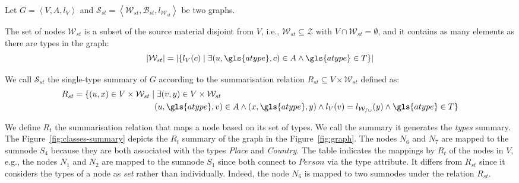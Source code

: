 \begin{definition}
Let $G=\left\langle V, A, l_V \right\rangle$ and $\mathcal{S}_{st} = \left\langle \mathcal{W}_{st}, \mathcal{B}_{st}, l_{\mathcal{W}_{st}} \right\rangle$ be two graphs.

The set of nodes $\mathcal{W}_{st}$ is a subset of the source material disjoint from $V$, i.e., $\mathcal{W}_{st} \subseteq \mathcal{Z}$ with $V \cap \mathcal{W}_{st} = \emptyset$, and it contains as many elements as there are types in the graph:
$$
\lvert \mathcal{W}_{st} \rvert = \lvert \left\lbrace l_V(c) \mid \exists (u, \gls{atype}, c) \in A \wedge \gls{atype} \in T \right\rbrace \rvert
$$

We call $\mathcal{S}_{st}$ the single-type summary of $G$ according to the summarisation relation $R_{st} \subseteq V \times \mathcal{W}_{st}$ defined as:
$$
\begin{aligned}
R_{st} = \{ (u, x) \in V \times \mathcal{W}_{st} \mid &\; \exists (v, y) \in V \times \mathcal{W}_{st} \\
	& (u,\gls{atype},v) \in A \wedge (x,\gls{atype},y) \wedge l_V(v) = l_\mathcal{W_{st}}(y) \wedge \gls{atype} \in T \}
\end{aligned}
$$
\label{def:st}
\end{definition}
\vspace{.5cm}


We define $R_t$ the summarisation relation that maps a node based on its set of types. We call the summary it generates the \emph{types} summary.
The Figure~\ref{fig:classes-summary} depicts the $R_t$ summary of the graph in the Figure~\ref{fig:graph}. The nodes $N_6$ and $N_7$ are mapped to the sumnode $S_4$ because they are both associated with the types \emph{Place} and \emph{Country}. The table indicates the mappings by $R_t$ of the nodes in $V$, e.g., the nodes $N_1$ and $N_2$ are mapped to the sumnode $S_1$ since both connect to $Person$ via the type attribute. It differs from $R_{st}$ since it considers the types of a node as \emph{set} rather than individually. Indeed, the node $N_6$ is mapped to two sumnodes under the relation $R_{st}$.

